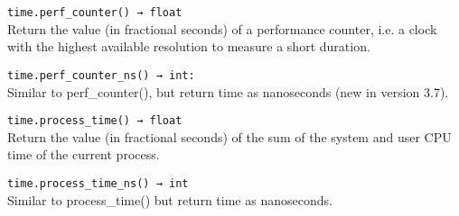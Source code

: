 \vspace{0.5cm}
\texttt{time.perf\_counter() → float}\\
Return the value (in fractional seconds) of a performance counter, i.e. a clock with the highest available resolution to measure a short duration.

\texttt{time.perf\_counter\_ns() → int:}\\
Similar to perf\_counter(), but return time as nanoseconds (new in version 3.7).

\texttt{time.process\_time() → float}\\
Return the value (in fractional seconds) of the sum of the system and user CPU time of the current process.

\texttt{time.process\_time\_ns() → int}\\
Similar to process\_time() but return time as nanoseconds.


